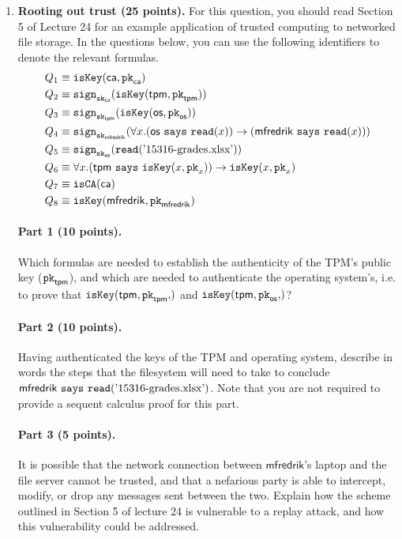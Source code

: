 \documentclass[10pt]{article}
\newcommand{\matt}{\ensuremath{\mathsf{mfredrik}}\xspace}
\newcommand{\ca}{\ensuremath{\mathsf{ca}}\xspace}
\newcommand{\tpm}{\ensuremath{\mathsf{tpm}}\xspace}
\newcommand{\os}{\ensuremath{\mathsf{os}}\xspace}
\newcommand{\sktpm}{\sk{\tpm}}
\newcommand{\pktpm}{\pk{\tpm}}
\newcommand{\skca}{\sk{\ca}}
\newcommand{\pk}[1]{\ensuremath{\keywordfont{pk}_{#1}}\xspace}
\newcommand{\sk}[1]{\ensuremath{\keywordfont{sk}_{#1}}\xspace}
\newcommand{\isca}[1]{\ensuremath{\keywordfont{isCA}(#1)}\xspace}
\newcommand{\iskey}[2]{\ensuremath{\keywordfont{isKey}(#1,#2)}\xspace}
\newcommand{\sign}[2]{\ensuremath{\keywordfont{sign}_{#1}(#2)}\xspace}
\newcommand{\readf}[1]{\ensuremath{\keywordfont{read}(#1)}\xspace}
\begin{document}
\begin{enumerate}
\newpage

\item\textbf{Rooting out trust (25 points).} For this question, you should read Section 5 of Lecture 24 for an example application of trusted computing to networked file storage. In the questions below, you can use the following identifiers to denote the relevant formulas.
\begin{align*}
Q_1 &\equiv \iskey{\ca}{\pk{\ca}} \\
Q_2 &\equiv \sign{\skca}{\iskey{\tpm}{\pktpm}} \\
Q_3 &\equiv \sign{\sktpm}{\iskey{\os}{\pk{\os}}} \\
Q_4 &\equiv \sign{\sk{\matt}}{\forall x . (\says{\os}{\readf{x}}) \limply (\says{\matt}{\readf{x}})} \\
Q_5 &\equiv \sign{\sk{\os}}{\readf{\text{'15316-grades.xlsx'}}} \\
Q_6 &\equiv \forall x . (\says{\tpm}{\iskey{x}{\pk{x}}}) \limply \iskey{x}{\pk{x}} \\
Q_7 &\equiv \isca{\ca} \\
Q_8 &\equiv \iskey{\matt}{\pk{\matt}}
\end{align*}

\paragraph{Part 1 (10 points).} Which formulas are needed to establish the authenticity of the TPM's public key ($\pk{\tpm}$), and which are needed to authenticate the operating system's, i.e. to prove that $\iskey{\tpm,\pk{\tpm}}$ and $\iskey{\tpm,\pk{\os}}$?

\newpage

\paragraph{Part 2 (10 points).} Having authenticated the keys of the TPM and operating system, describe in words the steps that the filesystem will need to take to conclude $\says{\matt}{\readf{\text{'15316-grades.xlsx'}}}$. Note that you are not required to provide a sequent calculus proof for this part.

\newpage

\paragraph{Part 3 (5 points).} It is possible that the network connection between \matt's laptop and the file server cannot be trusted, and that a nefarious party is able to intercept, modify, or drop any messages sent between the two. Explain how the scheme outlined in Section 5 of lecture 24 is vulnerable to a replay attack, and how this vulnerability could be addressed.

\end{enumerate}
\end{document}
